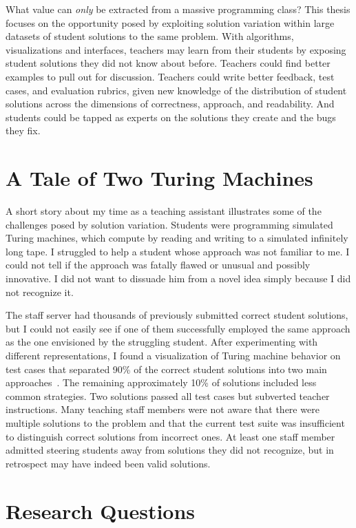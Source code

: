 What value can {\it only} be extracted from a massive programming class? This thesis focuses on the opportunity posed by exploiting solution variation within large datasets of student solutions to the same problem. With algorithms, visualizations and interfaces, teachers may learn from their students by exposing student solutions they did not know about before. Teachers could find better examples to pull out for discussion. Teachers could write better feedback, test cases, and evaluation rubrics, given new knowledge of the distribution of student solutions across the dimensions of correctness, approach, and readability. And students could be tapped as experts on the solutions they create and the bugs they fix.

\section{A Tale of Two Turing Machines}

A short story about my time as a teaching assistant illustrates some of the challenges posed by solution variation. Students were programming simulated Turing machines, which compute by reading and writing to a simulated infinitely long tape. I struggled to help a student whose approach was not familiar to me. I could not tell if the approach was fatally flawed or unusual and possibly innovative. I did not want to dissuade him from a novel idea simply because I did not recognize it.

The staff server had thousands of previously submitted correct student solutions, but I could not easily see if one of them successfully employed the same approach as the one envisioned by the struggling student. After experimenting with different representations, I found a visualization of Turing machine behavior on test cases that separated 90\% of the correct student solutions into two main approaches~\cite{ICERGlassman}. The remaining approximately 10\% of solutions included less common strategies. Two solutions passed all test cases but subverted teacher instructions. Many teaching staff members were not aware that there were multiple solutions to the problem and that the current test suite was insufficient to distinguish correct solutions from incorrect ones. At least one staff member admitted steering students away from solutions they did not recognize, but in retrospect may have indeed been valid solutions.

\section{Research Questions}

